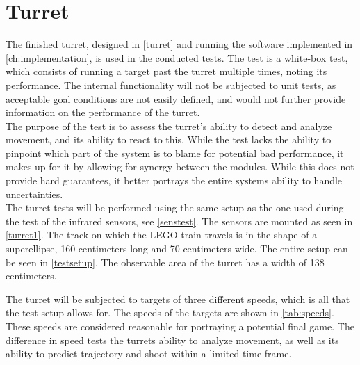 \section{Turret}\label{sec:turrettest}
The finished turret, designed in \cref{turret} and running the software implemented in \cref{ch:implementation}, is used in the conducted tests. The test is a white-box test, which consists of running a target past the turret multiple times, noting its performance. The internal functionality will not be subjected to unit tests, as acceptable goal conditions are not easily defined, and would not further provide information on the performance of the turret. \\

The purpose of the test is to assess the turret's ability to detect and analyze movement, and its ability to react to this. While the test lacks the ability to pinpoint which part of the system is to blame for potential bad performance, it makes up for it by allowing for synergy between the modules. While this does not provide hard guarantees, it better portrays the entire systems ability to handle uncertainties. \\


The turret tests will be performed using the same setup as the one used during the test of the infrared sensors, see \cref{senstest}. The sensors are mounted as seen in \cref{turret1}. The track on which the LEGO train travels is in the shape of a superellipse, 160 centimeters long and 70 centimeters wide. The entire setup can be seen in \cref{testsetup}. The observable area of the turret has a width of 138 centimeters.


The turret will be subjected to targets of three different speeds, which is all that the test setup allows for. The speeds of the targets are shown in \cref{tab:speeds}. These speeds are considered reasonable for portraying a potential final game. The difference in speed tests the turrets ability to analyze movement, as well as its ability to predict trajectory and shoot within a limited time frame.

